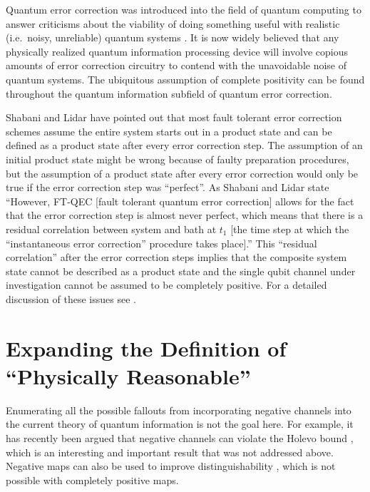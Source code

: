 Quantum error correction was introduced into the field of quantum computing to answer criticisms about the viability of doing something useful with realistic (i.e.\ noisy, unreliable) quantum systems \cite{Nielsen2010,Aharonov2008,Shabani2009}.  It is now widely believed that any physically realized quantum information processing device will involve copious amounts of error correction circuitry to contend with the unavoidable noise of quantum systems.  The ubiquitous assumption of complete positivity can be found throughout the quantum information subfield of quantum error correction.  

Shabani and Lidar \cite{Lidar2009} have pointed out that most fault tolerant error correction schemes assume the entire system starts out in a product state and can be defined as a product state after every error correction step.  The assumption of an initial product state might be wrong because of faulty preparation procedures, but the assumption of a product state after every error correction would only be true if the error correction step was ``perfect''.  As Shabani and Lidar state ``However, FT-QEC [fault tolerant quantum error correction] allows for the fact that the error correction step is almost never perfect, which means that there is a residual correlation between system and bath at $t_1$ [the time step at which the ``instantaneous error correction'' procedure takes place].'' \cite{Lidar2009}  This ``residual correlation'' after the error correction steps implies that the composite system state cannot be described as a product state and the single qubit channel under investigation cannot be assumed to be completely positive.  For a detailed discussion of these issues see \cite{Shabani2009}.  

\section{Expanding the Definition of ``Physically Reasonable''}

Enumerating all the possible fallouts from incorporating negative channels into the current theory of quantum information is not the goal here.  For example, it has recently been argued that negative channels can violate the Holevo bound \cite{Masillo2011}, which is an interesting and important result that was not addressed above.  Negative maps can also be used to improve distinguishability \cite{Carteret2008}, which is not possible with completely positive maps.  

